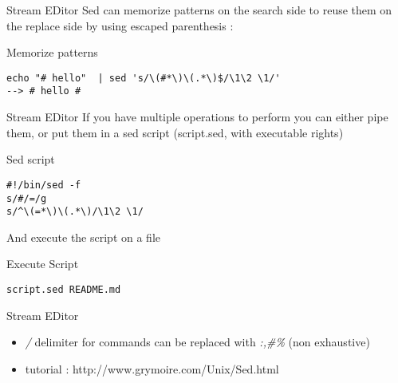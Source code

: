 \begin{frame}[fragile]{Stream EDitor}
Sed can memorize patterns on the search side to reuse them on the replace side by using escaped parenthesis :
\pause
  \begin{exampleblock}{Memorize patterns}
    \begin{lstlisting}[showstringspaces=false,basicstyle=\tiny]
echo "# hello"  | sed 's/\(#*\)\(.*\)$/\1\2 \1/'
--> # hello #
    \end{lstlisting}
  \end{exampleblock}
\end{frame}

\begin{frame}[fragile]{Stream EDitor}
If you have multiple operations to perform you can either pipe them, or put them in a sed script (script.sed, with executable rights)
\pause
  \begin{exampleblock}{Sed script}
    \begin{lstlisting}[showstringspaces=false,basicstyle=\tiny]
#!/bin/sed -f
s/#/=/g
s/^\(=*\)\(.*\)/\1\2 \1/
    \end{lstlisting}
  \end{exampleblock}

\pause
And execute the script on a file
  \begin{exampleblock}{Execute Script}
    \begin{lstlisting}[showstringspaces=false,basicstyle=\tiny]
script.sed README.md
    \end{lstlisting}
  \end{exampleblock}
\end{frame}


\begin{frame}[fragile]{Stream EDitor}
  \begin{itemize}
    \item\emph{/} delimiter for commands can be replaced with \emph{:,\#\%} (non exhaustive)
    \pause
    
    \item tutorial : http://www.grymoire.com/Unix/Sed.html
  \end{itemize}
\end{frame}
